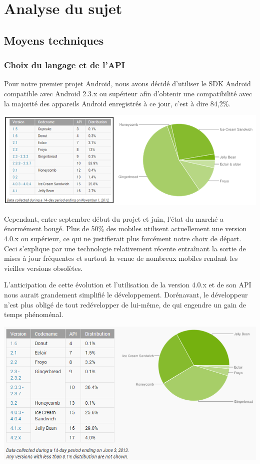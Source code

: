 \documentclass{report}
\begin{document}
\section{Analyse du sujet}

\subsection{Moyens techniques}

\subsubsection{Choix du langage et de l'API}

Pour notre premier projet Android, nous avons décidé d’utiliser le SDK Android compatible avec Android 2.3.x ou supérieur afin d’obtenir une compatibilité avec la majorité des appareils Android enregistrés à ce jour, c’est à dire 84,2\%.

\includegraphics[scale=0.75]{images/graph1}

Cependant, entre septembre début du projet et juin, l’état du marché a énormément bougé.
Plus de 50\% des mobiles utilisent actuellement une version 4.0.x ou supérieur, ce qui ne justifierait plus forcément notre choix de départ.
Ceci s’explique par une technologie relativement récente entraînant la sortie de mises à jour fréquentes et surtout la venue de nombreux mobiles rendant les vieilles versions obsolètes.

L’anticipation de cette évolution et l’utilisation de la version 4.0.x et de son API nous aurait grandement simplifié le développement. Dorénavant, le développeur n’est plus obligé de tout redévelopper de lui-même, de qui engendre un gain de temps phénoménal.
\bigskip


\includegraphics[scale=0.75]{images/graph2}
\end{document}
